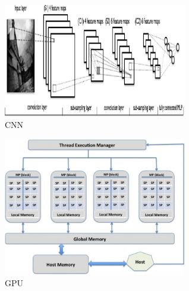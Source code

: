 \documentclass[sigconf]{acmart}
\begin{document}
\begin{figure}[htp]
\centering
\includegraphics[width=80mm]{images/paper1-fig2.png}
\caption{CNN}
\label{fig:2}
\end{figure}

\begin{figure}[htp]
\centering
\includegraphics[width=80mm]{images/paper1-figure3.png}
\caption{GPU}
\label{fig:3}
\end{figure}


\end{document}
